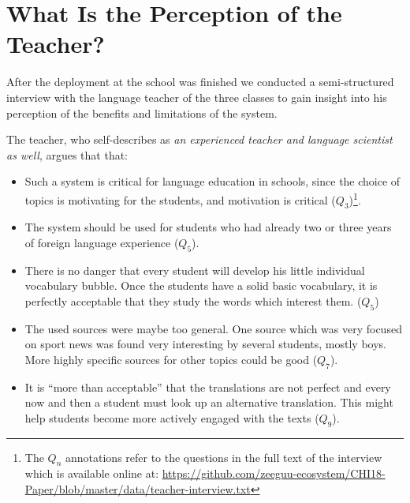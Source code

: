 
\newcommand{\q}[1]{($Q_#1$)}
\newcommand{\qq}[2]{($Q_#1,Q_{#2}$)}

\section{What Is the Perception of the Teacher?}
After the deployment at the school was finished we conducted a semi-structured interview with the language teacher of the three classes to gain insight into his perception of the benefits and limitations of the system. 

The teacher, who self-describes as {\em an experienced teacher and language scientist as well}, argues that that: 

\begin{itemize}

	\item Such a system is critical for language education in schools, since the choice of topics is motivating for the students, and motivation is critical \q{3}\footnote{The $Q_n$ annotations refer to the questions in the full text of the interview which is available online at: \url{https://github.com/zeeguu-ecosystem/CHI18-Paper/blob/master/data/teacher-interview.txt}}. 

	\item The system should be used for students who had already two or three years of foreign language experience \q{5}. 

	\item There is no danger that every student will develop his little individual vocabulary bubble. Once the students have a solid basic vocabulary, it is perfectly acceptable that they study the words which interest them. \q{5}

	\item The used sources were maybe too general. One source which was very focused on sport news was found very interesting by several students, mostly boys. More highly specific sources for other topics could be good \q{7}.



	\item It is ``more than acceptable'' that the translations are not perfect and every now and then a student must look up an alternative translation. This might help students become more actively engaged with the texts \q{9}. 


\end{itemize}
